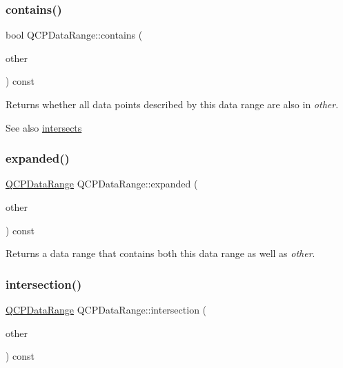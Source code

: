 \subsubsection{\texorpdfstring{contains()}{contains()}}
{\footnotesize\ttfamily bool Q\+C\+P\+Data\+Range\+::contains (\begin{DoxyParamCaption}\item[{const \mbox{\hyperlink{class_q_c_p_data_range}{Q\+C\+P\+Data\+Range}} \&}]{other }\end{DoxyParamCaption}) const}

Returns whether all data points described by this data range are also in {\itshape other}.

\begin{DoxySeeAlso}{See also}
\mbox{\hyperlink{class_q_c_p_data_range_a8a1c437f9beffd55621f48f961d7f679}{intersects}} 
\end{DoxySeeAlso}
\mbox{\label{class_q_c_p_data_range_a36c8ad8acf177ffeb0a72c8d73030844}} 
\subsubsection{\texorpdfstring{expanded()}{expanded()}}
{\footnotesize\ttfamily \mbox{\hyperlink{class_q_c_p_data_range}{Q\+C\+P\+Data\+Range}} Q\+C\+P\+Data\+Range\+::expanded (\begin{DoxyParamCaption}\item[{const \mbox{\hyperlink{class_q_c_p_data_range}{Q\+C\+P\+Data\+Range}} \&}]{other }\end{DoxyParamCaption}) const}

Returns a data range that contains both this data range as well as {\itshape other}. \mbox{\label{class_q_c_p_data_range_a84e1e03129dd52528efb4bac18d30183}} 
\subsubsection{\texorpdfstring{intersection()}{intersection()}}
{\footnotesize\ttfamily \mbox{\hyperlink{class_q_c_p_data_range}{Q\+C\+P\+Data\+Range}} Q\+C\+P\+Data\+Range\+::intersection (\begin{DoxyParamCaption}\item[{const \mbox{\hyperlink{class_q_c_p_data_range}{Q\+C\+P\+Data\+Range}} \&}]{other }\end{DoxyParamCaption}) const}

